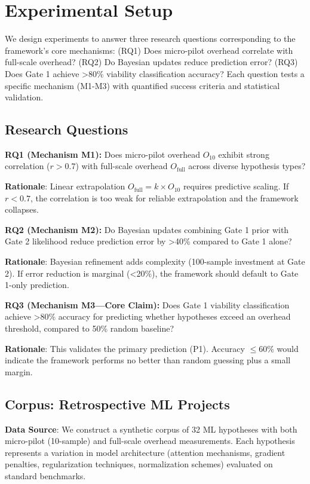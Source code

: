 \section{Experimental Setup}

We design experiments to answer three research questions corresponding to the framework's core mechanisms: (RQ1) Does micro-pilot overhead correlate with full-scale overhead? (RQ2) Do Bayesian updates reduce prediction error? (RQ3) Does Gate 1 achieve >80\% viability classification accuracy? Each question tests a specific mechanism (M1-M3) with quantified success criteria and statistical validation.

\subsection{Research Questions}

\textbf{RQ1 (Mechanism M1):} Does micro-pilot overhead $O_{10}$ exhibit strong correlation ($r > 0.7$) with full-scale overhead $O_{\text{full}}$ across diverse hypothesis types?

\textbf{Rationale}: Linear extrapolation $O_{\text{full}} = k \times O_{10}$ requires predictive scaling. If $r < 0.7$, the correlation is too weak for reliable extrapolation and the framework collapses.

\textbf{RQ2 (Mechanism M2):} Do Bayesian updates combining Gate 1 prior with Gate 2 likelihood reduce prediction error by >40\% compared to Gate 1 alone?

\textbf{Rationale}: Bayesian refinement adds complexity (100-sample investment at Gate 2). If error reduction is marginal (<20\%), the framework should default to Gate 1-only prediction.

\textbf{RQ3 (Mechanism M3---Core Claim):} Does Gate 1 viability classification achieve >80\% accuracy for predicting whether hypotheses exceed an overhead threshold, compared to 50\% random baseline?

\textbf{Rationale}: This validates the primary prediction (P1). Accuracy $\leq$60\% would indicate the framework performs no better than random guessing plus a small margin.

\subsection{Corpus: Retrospective ML Projects}

\textbf{Data Source}: We construct a synthetic corpus of 32 ML hypotheses with both micro-pilot (10-sample) and full-scale overhead measurements. Each hypothesis represents a variation in model architecture (attention mechanisms, gradient penalties, regularization techniques, normalization schemes) evaluated on standard benchmarks.

